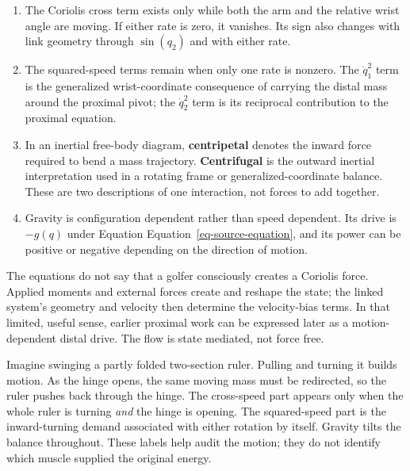\documentclass[
  letterpaper,
]{report}
\providecommand{\tightlist}{%
  \setlength{\itemsep}{0pt}\setlength{\parskip}{0pt}}
\begin{document}
\begin{enumerate}
\def\labelenumi{\arabic{enumi}.}
\tightlist
\item
  The Coriolis cross term exists only while both the arm and the
  relative wrist angle are moving. If either rate is zero, it vanishes.
  Its sign also changes with link geometry through \(\sin(q_2)\) and
  with either rate.
\item
  The squared-speed terms remain when only one rate is nonzero. The
  \(\dot q_1^2\) term is the generalized wrist-coordinate consequence of
  carrying the distal mass around the proximal pivot; the \(\dot q_2^2\)
  term is its reciprocal contribution to the proximal equation.
\item
  In an inertial free-body diagram, \textbf{centripetal} denotes the
  inward force required to bend a mass trajectory. \textbf{Centrifugal}
  is the outward inertial interpretation used in a rotating frame or
  generalized-coordinate balance. These are two descriptions of one
  interaction, not forces to add together.
\item
  Gravity is configuration dependent rather than speed dependent. Its
  drive is \(-g(q)\) under Equation Equation~\ref{eq-source-equation},
  and its power can be positive or negative depending on the direction
  of motion.
\end{enumerate}

The equations do not say that a golfer consciously creates a Coriolis
force. Applied moments and external forces create and reshape the state;
the linked system's geometry and velocity then determine the
velocity-bias terms. In that limited, useful sense, earlier proximal
work can be expressed later as a motion-dependent distal drive. The flow
is state mediated, not force free.

\begin{tcolorbox}[enhanced jigsaw, colbacktitle=quarto-callout-note-color!10!white, arc=.35mm, opacityback=0, toptitle=1mm, rightrule=.15mm, bottomrule=.15mm, titlerule=0mm, opacitybacktitle=0.6, colback=white, bottomtitle=1mm, title=\textcolor{quarto-callout-note-color}{\faInfo}\hspace{0.5em}{Plain-language picture}, leftrule=.75mm, coltitle=black, breakable, toprule=.15mm, left=2mm, colframe=quarto-callout-note-color-frame]

Imagine swinging a partly folded two-section ruler. Pulling and turning
it builds motion. As the hinge opens, the same moving mass must be
redirected, so the ruler pushes back through the hinge. The cross-speed
part appears only when the whole ruler is turning \emph{and} the hinge
is opening. The squared-speed part is the inward-turning demand
associated with either rotation by itself. Gravity tilts the balance
throughout. These labels help audit the motion; they do not identify
which muscle supplied the original energy.

\end{tcolorbox}
\end{document}
